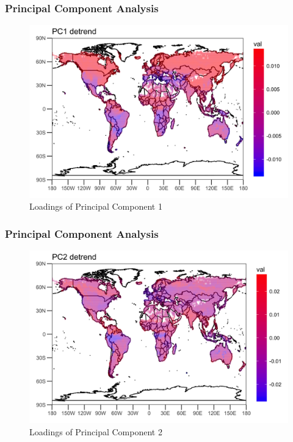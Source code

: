 \documentclass{beamer}
\begin{document}
\begin{frame}
\frametitle{Principal Component Analysis}
\begin{figure}
	\centering
	\includegraphics[width=0.9\linewidth]{../img/loading_PC1_de}
	\caption{Loadings of Principal Component 1}
	\label{fig:loadingpc1}
\end{figure}
\end{frame}

\begin{frame}
\frametitle{Principal Component Analysis}
\begin{figure}
	\centering
	\includegraphics[width=0.9\linewidth]{../img/loading_PC2_de}
	\caption{Loadings of Principal Component 2}
	\label{fig:loadingpc2}
\end{figure}
\end{frame}
\end{document}
